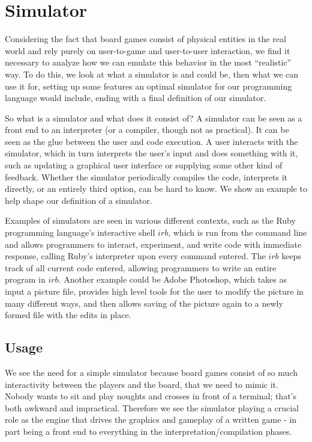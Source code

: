 \section{Simulator}
Considering the fact that board games consist of physical entities in the real world and rely purely on user-to-game and user-to-user interaction, we find it necessary to analyze how we can emulate this behavior in the most ``realistic'' way. To do this, we look at what a simulator is and could be, then what we can use it for, setting up some features an optimal simulator for our programming language would include, ending with a final definition of our simulator.

So what is a simulator and what does it consist of? A simulator can be seen as a front end to an interpreter (or a compiler, though not as practical). It can be seen as the glue between the user and code execution. A user interacts with the simulator, which in turn interprets the user's input and does something with it, such as updating a graphical user interface or supplying some other kind of feedback. Whether the simulator periodically compiles the code, interprets it directly, or an entirely third option, can be hard to know. We show an example to help shape our definition of a simulator.

Examples of simulators are seen in various different contexts, such as the Ruby\cite{rubyLang} programming language's interactive shell $irb$, which is run from the command line and allows programmers to interact, experiment, and write code with immediate response, calling Ruby's interpreter upon every command entered. The $irb$ keeps track of all current code entered, allowing programmers to write an entire program in $irb$. Another example could be Adobe\textsuperscript{\textregistered} Photoshop\textsuperscript{\textregistered}, which takes as input a picture file, provides high level tools for the user to modify the picture in many different ways, and then allows saving of the picture again to a newly formed file with the edits in place.

\subsection{Usage}
We see the need for a simple simulator because board games consist of so much interactivity between the players and the board, that we need to mimic it. Nobody wants to sit and play noughts and crosses in front of a terminal; that's both awkward and impractical. Therefore we see the simulator playing a crucial role as the engine that drives the graphics and gameplay of a written game - in part being a front end to everything in the interpretation/compilation phases.

